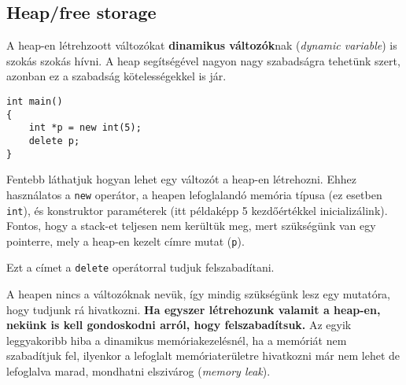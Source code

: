 \documentclass[a4paper,11.5pt,table]{article}
\begin{document}
	\subsection{Heap/free storage}
	A heap-en létrehzoott változókat \textbf{dinamikus változók}nak (\textit{dynamic variable}) is szokás szokás hívni. A heap segítségével nagyon nagy szabadságra tehetünk szert, azonban ez a szabadság kötelességekkel is jár.
	\begin{lstlisting}
int main()
{
	int *p = new int(5);
	delete p;
}
	\end{lstlisting}
	Fentebb láthatjuk hogyan lehet egy változót a heap-en létrehozni. Ehhez használatos a \texttt{new} operátor, a heapen lefoglalandó memória típusa (ez esetben \texttt{int}), és konstruktor paraméterek (itt példaképp 5 kezdőértékkel inicializálink). Fontos, hogy a stack-et teljesen nem kerültük meg, mert szükségünk van egy pointerre, mely a heap-en kezelt címre mutat (\texttt{p}).
	
	Ezt a címet a \texttt{delete} operátorral tudjuk felszabadítani.
	\begin{center}
	\end{center}
	
	A heapen nincs a változóknak nevük, így mindig szükségünk lesz egy mutatóra, hogy tudjunk rá hivatkozni. \textbf{Ha egyszer létrehozunk valamit a heap-en, nekünk is kell gondoskodni arról, hogy felszabadítsuk.} Az egyik leggyakoribb hiba a dinamikus memóriakezelésnél, ha a memóriát nem szabadítjuk fel, ilyenkor a lefoglalt memóriaterületre hivatkozni már nem lehet de lefoglalva marad, mondhatni elszivárog (\textit{memory leak}). 
	\smallskip
	
\end{document}
